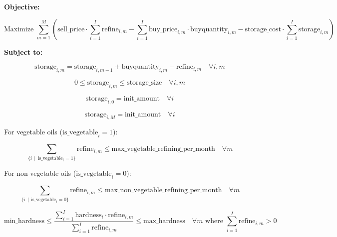 \documentclass{article}
\begin{document}
\textbf{Objective:}

\[
\text{Maximize } \sum_{m=1}^{M} \left( \text{sell\_price} \cdot \sum_{i=1}^{I} \text{refine}_{i,m} - \sum_{i=1}^{I} \text{buy\_price}_{i,m} \cdot \text{buyquantity}_{i,m} - \text{storage\_cost} \cdot \sum_{i=1}^{I} \text{storage}_{i,m} \right)
\]

\textbf{Subject to:}

\[
\text{storage}_{i,m} = \text{storage}_{i,m-1} + \text{buyquantity}_{i,m} - \text{refine}_{i,m} \quad \forall i, m
\]

\[
0 \leq \text{storage}_{i,m} \leq \text{storage\_size} \quad \forall i, m
\]

\[
\text{storage}_{i,0} = \text{init\_amount} \quad \forall i
\]

\[
\text{storage}_{i,M} = \text{init\_amount} \quad \forall i
\]

For vegetable oils (\(\text{is\_vegetable}_i = 1\)):

\[
\sum_{\{i \, \mid \, \text{is\_vegetable}_i = 1\}} \text{refine}_{i,m} \leq \text{max\_vegetable\_refining\_per\_month} \quad \forall m
\]

For non-vegetable oils (\(\text{is\_vegetable}_i = 0\)):

\[
\sum_{\{i \, \mid \, \text{is\_vegetable}_i = 0\}} \text{refine}_{i,m} \leq \text{max\_non\_vegetable\_refining\_per\_month} \quad \forall m
\]

\[
\text{min\_hardness} \leq \frac{\sum_{i=1}^{I} \text{hardness}_{i} \cdot \text{refine}_{i,m}}{\sum_{i=1}^{I} \text{refine}_{i,m}} \leq \text{max\_hardness} \quad \forall m \text{ where } \sum_{i=1}^{I} \text{refine}_{i,m} > 0
\]
\end{document}
